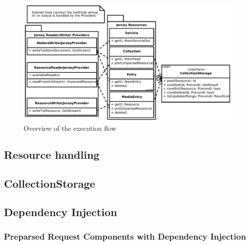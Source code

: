 \documentclass[12pt,a4paper,twoside]{scrartcl}		%
\begin{document}
\begin{figure}[htb]
  \centering
  \includegraphics[width=1.2\textwidth]{executionflowoverview}

  \caption{Overview of the execution flow}
  \label{fig:executionflowoverview}
\end{figure}

\subsection{Resource handling}
\label{sec:resource-handling}



\subsection{CollectionStorage}
\label{sec:collectionstorage}


\subsection{Dependency Injection}
\label{sec:dependency-injection}

\subsubsection{Preparsed Request Components with Dependency Injection}
\label{sec:prep-requ-comp}
\end{document}
